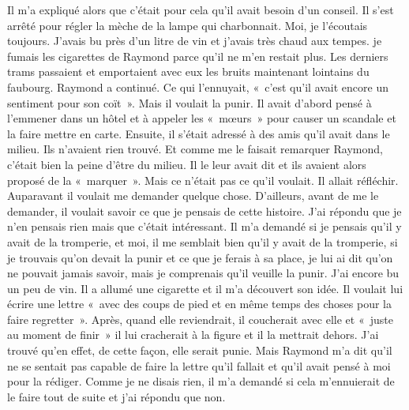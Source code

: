 \documentclass[french,twoside]{book} %
\begin{document}
Il m’a expliqué alors que c’était pour cela qu’il avait besoin d’un conseil. Il s’est arrêté pour régler la mèche de la lampe qui charbonnait. Moi, je l’écoutais toujours. J'avais bu près d’un litre de vin et j’avais très chaud aux tempes. je fumais les cigarettes de Raymond parce qu’il ne m’en restait plus. Les derniers trams passaient et emportaient avec eux les bruits maintenant lointains du faubourg. Raymond a continué. Ce qui l’ennuyait, « c’est qu’il avait encore un sentiment pour son coït ». Mais il voulait la punir. Il avait d’abord pensé à l’emmener dans un hôtel et à appeler les « mœurs » pour causer un scandale et la faire mettre en carte. Ensuite, il s’était adressé à des amis qu’il avait dans le milieu. Ils n’avaient rien trouvé. Et comme me le faisait remarquer Raymond, c’était bien la peine d’être du milieu. Il le leur avait dit et ils avaient alors proposé de la « marquer ». Mais ce n’était pas ce qu’il voulait. Il allait réfléchir. Auparavant il voulait me demander quelque chose. D'ailleurs, avant de me le demander, il voulait savoir ce que je pensais de cette histoire. J'ai répondu que je n’en pensais rien mais que c’était intéressant. Il m’a demandé si je pensais qu’il y avait de la tromperie, et moi, il me semblait bien qu’il y avait de la tromperie, si je trouvais qu’on devait la punir et ce que je ferais à sa place, je lui ai dit qu’on ne pouvait jamais savoir, mais je comprenais qu’il veuille la punir. J'ai encore bu un peu de vin. Il a allumé une cigarette et il m’a découvert son idée. Il voulait lui écrire une lettre « avec des coups de pied et en même temps des choses pour la faire regretter ». Après, quand elle reviendrait, il coucherait avec elle et « juste au moment de finir » il lui cracherait à la figure et il la mettrait dehors. J'ai trouvé qu’en effet, de cette façon, elle serait punie. Mais Raymond m’a dit qu’il ne se sentait pas capable de faire la lettre qu’il fallait et qu’il avait pensé à moi pour la rédiger. Comme je ne disais rien, il m’a demandé si cela m’ennuierait de le faire tout de suite et j’ai répondu que non.\par
\end{document}
